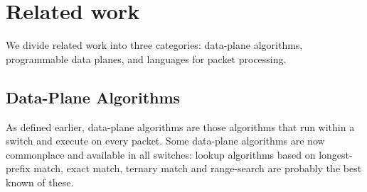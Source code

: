 \section{Related work}
\label{s:related}






We divide related work into three categories: data-plane algorithms, programmable
data planes, and languages for packet processing.

\subsection{Data-Plane Algorithms} 
As defined earlier, data-plane algorithms are those algorithms that run within
a switch and execute on every packet. Some data-plane algorithms are now
commonplace and available in all switches: lookup algorithms based on
longest-prefix match, exact match, ternary match and range-search are probably
the best known of these.

